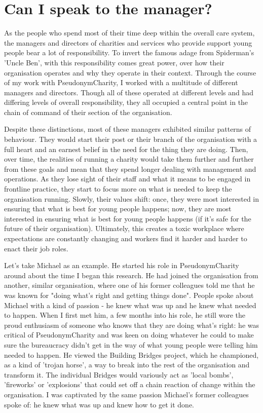 \section{Can I speak to the manager?}
\label{}
As the people who spend most of their time deep within the overall care system, the managers and directors of charities and services who provide support young people bear a lot of responsibility. To invert the famous adage from Spiderman's 'Uncle Ben', with this responsibility comes great power, over how their organisation operates and why they operate in their context. Through the course of my work with PseudonymCharity, I worked with a multitude of different managers and directors. Though all of these operated at different levels and had differing levels of overall responsibility, they all occupied a central point in the chain of command of their section of the organisation.

Despite these distinctions, most of these managers exhibited similar patterns of behaviour. They would start their post or their branch of the organisation with a full heart and an earnest belief in the need for the thing they are doing. Then, over time, the realities of running a charity would take them further and further from these goals and mean that they spend longer dealing with management and operations. As they lose sight of their staff and what it means to be engaged in frontline practice, they start to focus more on what is needed to keep the organisation running. Slowly, their values shift: once, they were most interested in ensuring that what is best for young people happens; now, they are most interested in ensuring what is best for young people happens (if it's safe for the future of their organisation). Ultimately, this creates a toxic workplace where expectations are constantly changing and workers find it harder and harder to enact their job roles.

Let's take Michael as an example. He started his role in PseudonymCharity around about the time I began this research. He had joined the organisation from another, similar organisation, where one of his former colleagues told me that he was known for "doing what's right and getting things done". People spoke about Michael with a kind of passion - he knew what was up and he knew what needed to happen. When I first met him, a few months into his role, he still wore the proud enthusiasm of someone who knows that they are doing what's right: he was critical of PseudonymCharity and was keen on doing whatever he could to make sure the bureaucracy didn't get in the way of what young people were telling him needed to happen. He viewed the Building Bridges project, which he championed, as a kind of 'trojan horse', a way to break into the rest of the organisation and transform it. The individual Bridges would variously act as 'local bombs', 'fireworks' or 'explosions' that could set off a chain reaction of change within the organisation. I was captivated by the same passion Michael's former colleagues spoke of: he knew what was up and knew how to get it done.

